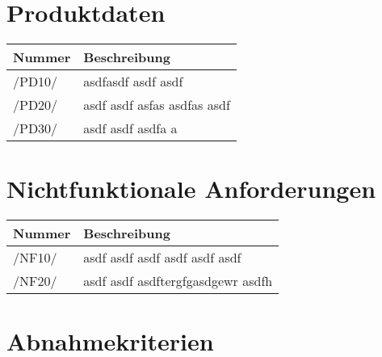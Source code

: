 \documentclass[a4paper,12pt]{article}
\newcommand\addrow[2]{#1 &#2\\ }
\newcommand\addheading[2]{#1 &#2\\ \hline}
\newcommand\tabularhead{\begin{tabular}{lp{13cm}}
\hline
}
\newenvironment{usecase}{\tabularhead}
{\hline\end{tabular}}
\begin{document}
\section{Produktdaten}
\begin{usecase}
  \addheading{Nummer}{Beschreibung} 
  \addrow{/PD10/}{asdfasdf asdf asdf }
  \addrow{/PD20/}{asdf asdf asfas asdfas asdf}
  \addrow{/PD30/}{asdf asdf asdfa a}
\end{usecase}

\section{Nichtfunktionale Anforderungen}
\begin{usecase}
  \addheading{Nummer}{Beschreibung} 
  \addrow{/NF10/}{asdf asdf asdf asdf asdf asdf }
  \addrow{/NF20/}{ asdf asdf asdftergfgasdgewr asdfh}
\end{usecase}

\section{Abnahmekriterien}

\clearpage
 
\end{document}
